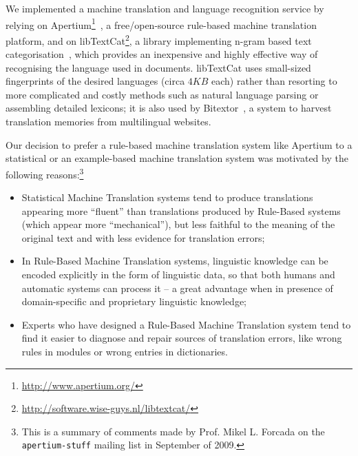 \documentclass[11pt]{article}
\begin{document}
We implemented a machine translation and language recognition service by relying on Apertium\footnote{\small\url{http://www.apertium.org/}}~\citep{armentano05p}, a free/open-source rule-based machine translation platform, and on libTextCat\footnote{\small\url{http://software.wise-guys.nl/libtextcat/}}, a library implementing n-gram based text categorisation~\citep{textcat}, which provides an inexpensive and highly effective way of recognising the language used in documents. libTextCat uses small-sized fingerprints of the desired languages (circa $4KB$ each) rather than resorting to more complicated and costly methods such as natural language parsing or assembling detailed lexicons; it is also used by Bitextor~\citep{espla-gomis2009bfs}, a system to harvest translation memories from multilingual websites.


Our decision to prefer a rule-based machine translation system like Apertium to a statistical or 
an example-based machine translation system was  motivated by the following reasons:\footnote{This is
a summary of comments made by Prof. Mikel L. Forcada on the {\tt\small apertium-stuff} mailing list
in September of 2009.}

\begin{itemize}
 \item Statistical Machine Translation systems tend to produce translations appearing more ``fluent'' than translations produced by Rule-Based systems (which appear more ``mechanical''), but less faithful to the meaning of the original text and with less evidence for translation errors;
 \item In Rule-Based Machine Translation systems, linguistic knowledge can be encoded explicitly in the form of linguistic data, so that both humans and automatic systems can process it -- a great advantage when in presence of domain-specific and proprietary linguistic knowledge;
 \item Experts who have designed a Rule-Based Machine Translation system tend to find it easier to diagnose and repair sources of translation errors, like wrong rules in modules or wrong entries in dictionaries.
\end{itemize}
\end{document}
